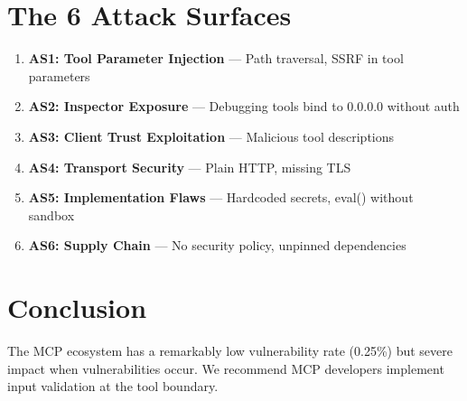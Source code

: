 \documentclass[10pt,conference]{IEEEtran}
\begin{document}
\section{The 6 Attack Surfaces}

\begin{enumerate}
\item \textbf{AS1: Tool Parameter Injection} — Path traversal, SSRF in tool parameters
\item \textbf{AS2: Inspector Exposure} — Debugging tools bind to 0.0.0.0 without auth
\item \textbf{AS3: Client Trust Exploitation} — Malicious tool descriptions
\item \textbf{AS4: Transport Security} — Plain HTTP, missing TLS
\item \textbf{AS5: Implementation Flaws} — Hardcoded secrets, eval() without sandbox
\item \textbf{AS6: Supply Chain} — No security policy, unpinned dependencies
\end{enumerate}

\section{Conclusion}
The MCP ecosystem has a remarkably low vulnerability rate (0.25\%) but severe impact when vulnerabilities occur. We recommend MCP developers implement input validation at the tool boundary.
\end{document}

